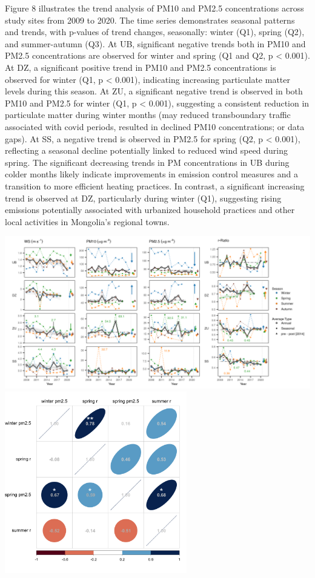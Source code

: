 \documentclass[
  11pt,
]{article}
\begin{document}
Figure 8 illustrates the trend analysis of PM10 and PM2.5 concentrations
across study sites from 2009 to 2020. The time series demonstrates
seasonal patterns and trends, with p-values of trend changes,
seasonally: winter (Q1), spring (Q2), and summer-autumn (Q3). At UB,
significant negative trends both in PM10 and PM2.5 concentrations are
observed for winter and spring (Q1 and Q2, p \textless{} 0.001). At DZ,
a significant positive trend in PM10 and PM2.5 concentrations is
observed for winter (Q1, p \textless{} 0.001), indicating increasing
particulate matter levels during this season. At ZU, a significant
negative trend is observed in both PM10 and PM2.5 for winter (Q1, p
\textless{} 0.001), suggesting a consistent reduction in particulate
matter during winter months (may reduced transboundary traffic
associated with covid periods, resulted in declined PM10 concentrations;
or data gaps). At SS, a negative trend is observed in PM2.5 for spring
(Q2, p \textless{} 0.001), reflecting a seasonal decline potentially
linked to reduced wind speed during spring. The significant decreasing
trends in PM concentrations in UB during colder months likely indicate
improvements in emission control measures and a transition to more
efficient heating practices. In contrast, a significant increasing trend
is observed at DZ, particularly during winter (Q1), suggesting rising
emissions potentially associated with urbanized household practices and
other local activities in Mongolia's regional towns.

\includegraphics[width=7.29167in,height=\textheight,keepaspectratio]{images/figure_8.png}
\includegraphics[width=3.125in,height=\textheight,keepaspectratio]{images/figure_9.png}
\end{document}

